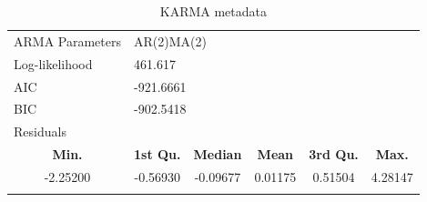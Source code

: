 \documentclass[12pt,a4paper,twoside]{article}
\begin{document}
\begin{longtable}{lccccc}
    \caption{KARMA metadata}\\
    \hline
    ARMA Parameters                   & \multicolumn{5}{l}{AR(2)MA(2)}                                                                     \\
    Log-likelihood                    & \multicolumn{5}{l}{461.617}                                                                        \\
    AIC                               & \multicolumn{5}{l}{-921.6661}                                                                      \\
    BIC                               & \multicolumn{5}{l}{-902.5418}                                                                      \\
    \hline
    \multicolumn{6}{l}{Residuals}                                                                                                          \\
    \hline
    \multicolumn{1}{c}{\textbf{Min.}} & \textbf{1st Qu.}              & \textbf{Median} & \textbf{Mean} & \textbf{3rd Qu.} & \textbf{Max.} \\
    \hline
    \multicolumn{1}{c}{-2.25200}      & -0.56930                      & -0.09677        & 0.01175       & 0.51504          & 4.28147       \\
    \hline
    \label{tab:KARMAmetadata}
\end{longtable}
\newpage
\end{document}
